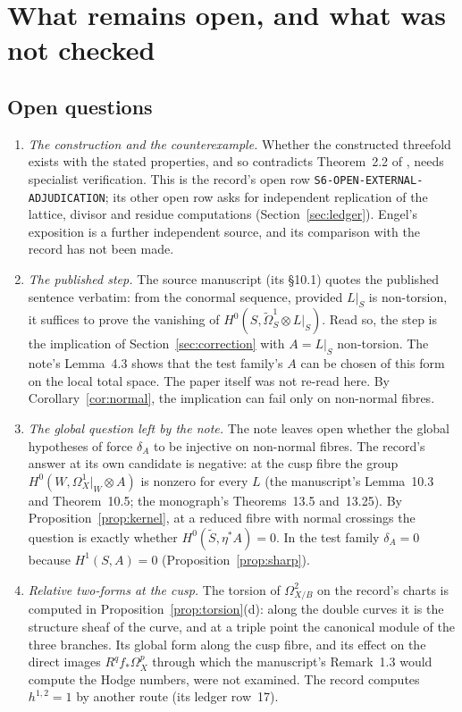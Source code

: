 \section{What remains open, and what was not checked}\label{sec:open}

\subsection{Open questions}

\begin{enumerate}[label=\arabic*.]
\item \emph{The construction and the counterexample.} Whether the constructed threefold exists with the stated properties, and so contradicts Theorem~2.2 of \cite{CDP20}, needs specialist verification. This is the record's open row \texttt{S6-OPEN-EXTERNAL-ADJUDICATION}; its other open row asks for independent replication of the lattice, divisor and residue computations (Section~\ref{sec:ledger}). Engel's exposition \cite{EngelS6} is a further independent source, and its comparison with the record has not been made.
\item \emph{The published step.} The source manuscript (its §10.1) quotes the published sentence verbatim: from the conormal sequence, provided $L|_S$ is non-torsion, it suffices to prove the vanishing of $H^0(S,\widetilde\Omega^1_S\otimes L|_S)$. Read so, the step is the implication of Section~\ref{sec:correction} with $A=L|_S$ non-torsion. The note's Lemma~4.3 shows that the test family's $A$ can be chosen of this form on the local total space. The paper itself was not re-read here. By Corollary~\ref{cor:normal}, the implication can fail only on non-normal fibres.
\item \emph{The global question left by the note.} The note leaves open whether the global hypotheses of \cite{CDP20} force $\delta_A$ to be injective on non-normal fibres. The record's answer at its own candidate is negative: at the cusp fibre the group $H^0(W,\Omega^1_X|_W\otimes A)$ is nonzero for every $L$ (the manuscript's Lemma~10.3 and Theorem~10.5; the monograph's Theorems~13.5 and~13.25). By Proposition~\ref{prop:kernel}, at a reduced fibre with normal crossings the question is exactly whether $H^0(\tilde S,\eta^*A)=0$. In the test family $\delta_A=0$ because $H^1(S,A)=0$ (Proposition~\ref{prop:sharp}).
\item \emph{Relative two-forms at the cusp.} The torsion of $\Omega^2_{X/B}$ on the record's charts is computed in Proposition~\ref{prop:torsion}(d): along the double curves it is the structure sheaf of the curve, and at a triple point the canonical module of the three branches. Its global form along the cusp fibre, and its effect on the direct images $R^qf_*\Omega^p_X$ through which the manuscript's Remark~1.3 would compute the Hodge numbers, were not examined. The record computes $h^{1,2}=1$ by another route (its ledger row~17).

\end{enumerate}
